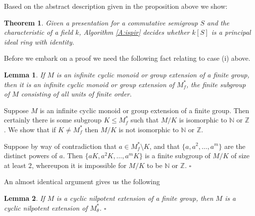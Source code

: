 \documentclass[12pt]{article}
\newtheorem{theorem}{\bf Theorem}
\newtheorem{lemma}{\bf Lemma}
\newenvironment{proof}{{\it Proof.\/}}{$\square$\\}
\begin{document}
Based on the abstract description given in 
the proposition above we show:

\begin{theorem}\label{t:main}
Given a presentation for a commutative semigroup
$S$  and the characteristic of a field $k$, 
Algorithm \ref{A:ispir} decides whether $k[S]$ is a principal
ideal ring with identity.
\end{theorem}

Before we embark on a proof we need the following 
fact relating to case (i) above.

\begin{lemma}\label{l:fext}
If $M$ is an infinite cyclic monoid or group extension of
a finite group, then it is an infinite cyclic monoid or group extension of
$M^*_f$, the finite subgroup of $M$ consisting of all units of finite 
order.
\end{lemma}

\begin{proof}
Suppose $M$ is an infinite cyclic monoid or group extension of
a finite group. Then certainly there is some subgroup
$K \leq M^*_f$ such that $M/K$ is isomorphic to $\mathbb{N}$ or 
$\mathbb{Z}$. We show that if $K \neq  M^*_f$ then
$M/K$ is not isomorphic to $\mathbb{N}$ or 
$\mathbb{Z}$.

Suppose by way of contradiction 
that $a \in M^*_f \setminus K$, and that $\{a, a^2, \ldots, a^m\}$ are
the distinct powers of $a$.  Then
$\{aK, a^2K, \ldots, a^mK\}$  is a  finite subgroup of $M/K$ of
size at least $2$, whereupon it is impossible for $M/K$ to be
$\mathbb{N}$ or $\mathbb{Z}$. 
\end{proof}

An almost identical argument gives us the following 

\begin{lemma}\label{l:cycnilp}
If $M$ is a cyclic nilpotent extension of a finite group, then
$M$ is a cyclic nilpotent extension of $M^*_\theta$. $\square$
\end{lemma} 
\end{document}

